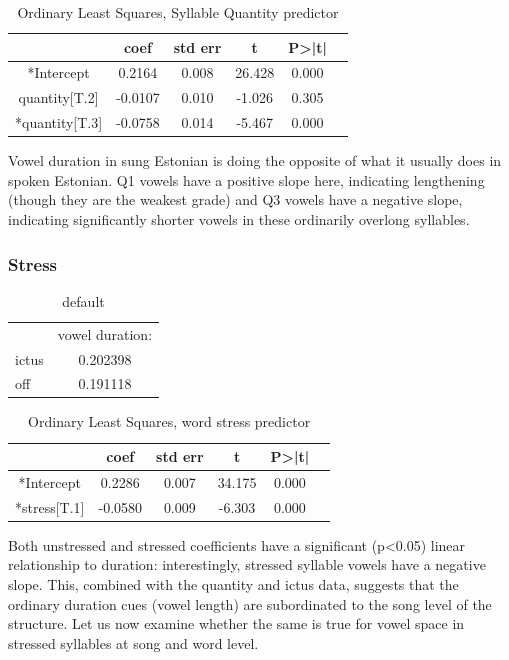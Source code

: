 \documentclass[12pt]{article}
\begin{document}
\begin{table}[htbp]
  \centering
  \begin{tabular}{@{} cccccc @{}}
    \toprule
 & coef &	std err &	t & P>|t| \\
    \midrule

*Intercept      &   0.2164    &  0.008    & 26.428  &    0.000       \\
quantity[T.2]   & -0.0107   &   0.010   &  -1.026    &  0.305      \\
*quantity[T.3]    & -0.0758  &    0.014   &  -5.467   &   0.000     \\
    \bottomrule
  \end{tabular}
  \caption{Ordinary Least Squares, Syllable Quantity predictor}
  \label{tab:label}
\end{table}
    \pagebreak
Vowel duration in sung Estonian is doing the opposite of what it usually does in spoken Estonian. Q1 vowels have a positive slope here, indicating lengthening (though they are the weakest grade) and Q3 vowels have a negative slope, indicating significantly shorter vowels in these ordinarily overlong syllables. 
\subsubsection*{Stress} 
\begin{table}[htp]
\caption{default}
\begin{center}
\begin{tabular}{|l|c|}
\hline
& vowel duration: \\ 
ictus &   0.202398 \\
off    &  0.191118 \\
\hline
\end{tabular}
\end{center}
\label{default}
\end{table}%




\begin{table}[htbp]
  \centering
  \begin{tabular}{@{} cccccc @{}}
    \toprule
 & coef &	std err &	t & P>|t| \\
    \midrule

*Intercept     &  0.2286   &   0.007    & 34.175  &     0.000    \\  
*stress[T.1]    &-0.0580     & 0.009     & -6.303      & 0.000     \\ 

    \bottomrule

\end{tabular}
\caption{Ordinary Least Squares, word stress predictor}
  \label{tab:label}
\end{table}
Both unstressed and stressed coefficients have a  significant (p<0.05) linear relationship to duration: interestingly, stressed syllable vowels have a negative slope.  This, combined with the quantity and ictus data, suggests that the ordinary duration cues (vowel length) are subordinated to the song level of the structure. Let us now examine whether the same is true for vowel space in stressed syllables at song and word level. 
\end{document}
